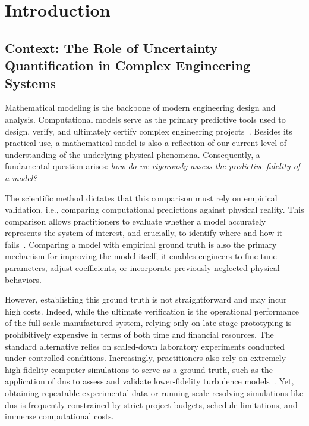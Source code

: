 %
\chapter{Introduction}
\label{sec:intro}


\section{Context: The Role of Uncertainty Quantification in Complex Engineering Systems}

Mathematical modeling is the backbone of modern engineering design and analysis. Computational models serve as the primary predictive tools used to design, verify, and ultimately certify complex engineering projects~\cite{uq_theory}. Besides its practical use, a mathematical model is also a reflection of our current level of understanding of the underlying physical phenomena. Consequently, a fundamental question arises: \textit{how do we rigorously assess the predictive fidelity of a model?}

\smallskip
The scientific method dictates that this comparison must rely on empirical validation, i.e., comparing computational predictions against physical reality. This comparison allows practitioners to evaluate whether a model accurately represents the system of interest, and crucially, to identify where and how it fails~\cite{oberkampf2010verification}. Comparing a model with empirical ground truth is also the primary mechanism for improving the model itself; it enables engineers to fine-tune parameters, adjust coefficients, or incorporate previously neglected physical behaviors. 

\smallskip
However, establishing this ground truth is not straightforward and may incur high costs. Indeed, while the ultimate verification is the operational performance of the full-scale manufactured system, relying only on late-stage prototyping is prohibitively expensive in terms of both time and financial resources. The standard alternative relies on scaled-down laboratory experiments conducted under controlled conditions. Increasingly, practitioners also rely on extremely high-fidelity computer simulations to serve as a ground truth, such as the application of \gls{dns} to assess and validate lower-fidelity turbulence models~\cite{moin1998direct}. Yet, obtaining repeatable experimental data or running scale-resolving simulations like \gls{dns} is frequently constrained by strict project budgets, schedule limitations, and immense computational costs. 


